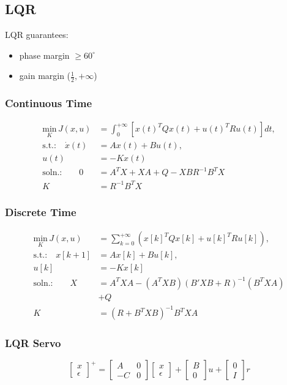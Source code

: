 \subsection{LQR}
LQR guarantees:
\begin{itemize}
    \item phase margin $\geq 60^\circ$
    \item gain margin ($\frac{1}{2}, +\infty$)
\end{itemize}

\subsubsection{Continuous Time}
    \vspace*{-0.4em}
    \begin{align*}
        \underset{K}{\text{min}} \, J(x,u) &= \int_{0}^{+\infty}[x(t)^TQx(t) + u(t)^TRu(t)]dt,\\[5pt]
        \text{s.t.:} \quad \dot{x}(t) &= Ax(t) + Bu(t),\\
        u(t) &= -Kx(t)\\[5pt]
        \text{soln.:} \qquad 0 &= A^TX + XA + Q - XBR^{-1}B^TX\\
        K &= R^{-1}B^TX
    \end{align*}

\subsubsection{Discrete Time}
    \vspace*{-0.4em}
    \begin{align*}
        \underset{K}{\text{min}} \, J(x,u) &= \sum_{k=0}^{+\infty}(x[k]^TQx[k] + u[k]^TRu[k]),\\[5pt]
        \text{s.t.:} \quad x[k+1] &= Ax[k] + Bu[k],\\
        u[k] &= -Kx[k]\\[5pt]
        \text{soln.:} \qquad X &= A^TXA - (A^TXB)(B'XB+R)^{-1}(B^TXA)\\
        &+Q\\
        K &= (R+B^TXB)^{-1}B^TXA
    \end{align*}

\subsubsection{LQR Servo}
    $$
    \begin{bmatrix} x \\ \epsilon \end{bmatrix} ^+
    = \begin{bmatrix} A & 0 \\ -C & 0 \end{bmatrix} \begin{bmatrix} x \\ \epsilon \end{bmatrix}
    + \begin{bmatrix} B \\ 0 \end{bmatrix} u + \begin{bmatrix} 0 \\ I \end{bmatrix} r
    $$